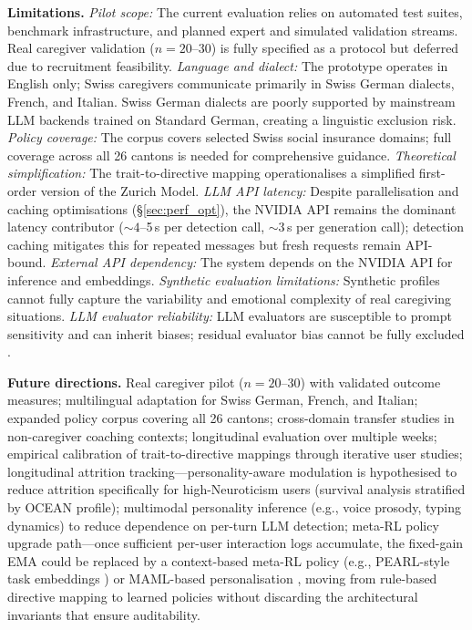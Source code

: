 \documentclass[10pt,a4paper]{report}
\begin{document}
\textbf{Limitations.} \emph{Pilot scope:} The current evaluation relies on automated test suites, benchmark infrastructure, and planned expert and simulated validation streams. Real caregiver validation ($n = 20$--30) is fully specified as a protocol but deferred due to recruitment feasibility. \emph{Language and dialect:} The prototype operates in English only; Swiss caregivers communicate primarily in Swiss German dialects, French, and Italian. Swiss German dialects are poorly supported by mainstream LLM backends trained on Standard German, creating a linguistic exclusion risk. \emph{Policy coverage:} The corpus covers selected Swiss social insurance domains; full coverage across all 26 cantons is needed for comprehensive guidance. \emph{Theoretical simplification:} The trait-to-directive mapping operationalises a simplified first-order version of the Zurich Model. \emph{LLM API latency:} Despite parallelisation and caching optimisations (\S\ref{sec:perf_opt}), the NVIDIA API remains the dominant latency contributor (${\sim}4$--5\,s per detection call, ${\sim}3$\,s per generation call); detection caching mitigates this for repeated messages but fresh requests remain API-bound. \emph{External API dependency:} The system depends on the NVIDIA API for inference and embeddings. \emph{Synthetic evaluation limitations:} Synthetic profiles cannot fully capture the variability and emotional complexity of real caregiving situations. \emph{LLM evaluator reliability:} LLM evaluators are susceptible to prompt sensitivity and can inherit biases; residual evaluator bias cannot be fully excluded \citep{Guo2023}.

\textbf{Future directions.} Real caregiver pilot ($n = 20$--30) with validated outcome measures; multilingual adaptation for Swiss German, French, and Italian; expanded policy corpus covering all 26 cantons; cross-domain transfer studies in non-caregiver coaching contexts; longitudinal evaluation over multiple weeks; empirical calibration of trait-to-directive mappings through iterative user studies; longitudinal attrition tracking---personality-aware modulation is hypothesised to reduce attrition specifically for high-Neuroticism users (survival analysis stratified by OCEAN profile); multimodal personality inference (e.g., voice prosody, typing dynamics) to reduce dependence on per-turn LLM detection; meta-RL policy upgrade path---once sufficient per-user interaction logs accumulate, the fixed-gain EMA could be replaced by a context-based meta-RL policy (e.g., PEARL-style task embeddings \citep{Rakelly2019}) or MAML-based personalisation \citep{Lin2019}, moving from rule-based directive mapping to learned policies without discarding the architectural invariants that ensure auditability.
\end{document}

